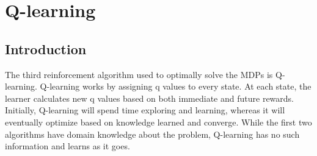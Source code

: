 \documentclass[h]{article}
\begin{document}
 
\section*{Q-learning}
\subsection*{Introduction}
The third reinforcement algorithm used to optimally solve the MDPs is 
Q-learning.  Q-learning works by assigning q values to every state.  At each state, the learner calculates new 
q values based on both immediate and future rewards.  Initially, Q-learning will 
spend time exploring and learning, whereas it will eventually optimize
based on knowledge learned and converge.  While the first two algorithms have domain knowledge about the problem, 
Q-learning has no such information and learns as it goes. 
\end{document}
